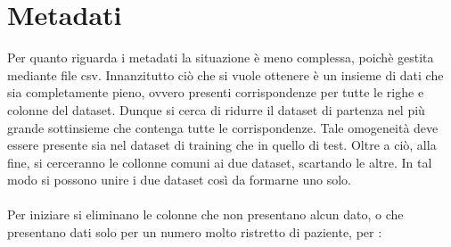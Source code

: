 \section{Metadati}
Per quanto riguarda i metadati la situazione è meno complessa, poichè gestita mediante file csv.
Innanzitutto ciò che si vuole ottenere è un insieme di dati che sia completamente pieno, ovvero presenti corrispondenze 
per tutte le righe e colonne del dataset.
Dunque si cerca di ridurre il dataset di partenza nel più grande sottinsieme che contenga tutte le corrispondenze.
Tale omogeneità deve essere presente sia nel dataset di training che in quello di test. Oltre a ciò, alla fine, si cerceranno le collonne comuni 
ai due dataset, scartando le altre. In tal modo si possono unire i due dataset così da formarne uno solo.
\\\\ 
Per iniziare si eliminano le colonne che non presentano alcun dato, o che presentano dati solo per un numero molto ristretto di paziente, per :
